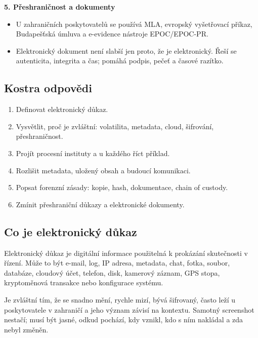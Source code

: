 \textbf{5. Přeshraničnost a dokumenty}
\begin{itemize}
  \item U zahraničních poskytovatelů se používá MLA, evropský vyšetřovací příkaz, Budapešťská úmluva a e-evidence nástroje EPOC/EPOC-PR.
  \item Elektronický dokument není slabší jen proto, že je elektronický. Řeší se autenticita, integrita a čas; pomáhá podpis, pečeť a časové razítko.
\end{itemize}

\subsection*{Kostra odpovědi}
\begin{enumerate}
  \item Definovat elektronický důkaz.
  \item Vysvětlit, proč je zvláštní: volatilita, metadata, cloud, šifrování, přeshraničnost.
  \item Projít procesní instituty a u každého říct příklad.
  \item Rozlišit metadata, uložený obsah a budoucí komunikaci.
  \item Popsat forenzní zásady: kopie, hash, dokumentace, chain of custody.
  \item Zmínit přeshraniční důkazy a elektronické dokumenty.
\end{enumerate}

\subsection*{Co je elektronický důkaz}
Elektronický důkaz je digitální informace použitelná k prokázání skutečnosti v řízení. Může to být e-mail, log, IP adresa, metadata, chat, fotka, soubor, databáze, cloudový účet, telefon, disk, kamerový záznam, GPS stopa, kryptoměnová transakce nebo konfigurace systému.

Je zvláštní tím, že se snadno mění, rychle mizí, bývá šifrovaný, často leží u poskytovatele v zahraničí a jeho význam závisí na kontextu. Samotný screenshot nestačí; musí být jasné, odkud pochází, kdy vznikl, kdo s ním nakládal a zda nebyl změněn.


